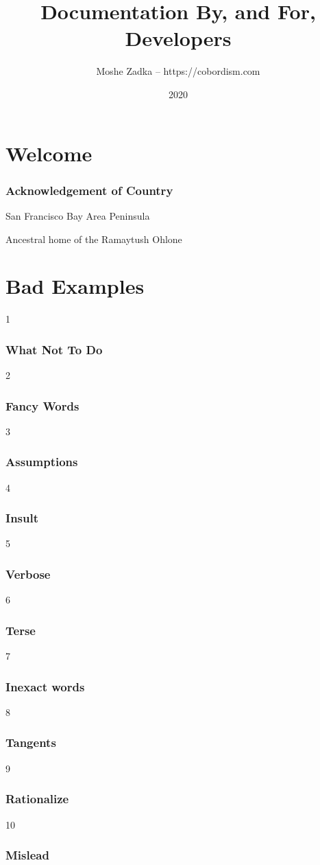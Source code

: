 \usepackage{hyperref}
\usepackage{graphicx}
\usepackage{listings}
\usepackage{textcomp}
\usepackage{fancyvrb}

\title{Documentation By, and For, Developers}
\author{Moshe Zadka -- https://cobordism.com}
\date{2020}


\begin{titlepage}
\maketitle
\end{titlepage}

\section{Welcome}

\frame{\titlepage}

\begin{frame}
\frametitle{Acknowledgement of Country}

San Francisco Bay Area Peninsula

Ancestral home of the Ramaytush Ohlone

\end{frame}

\section{Bad Examples}

1
\begin{frame}
\frametitle{What Not To Do}
\end{frame}

2
\begin{frame}
\frametitle{Fancy Words}
\end{frame}

3
\begin{frame}
\frametitle{Assumptions}
\end{frame}

4
\begin{frame}
\frametitle{Insult}
\end{frame}

5
\begin{frame}
\frametitle{Verbose}
\end{frame}

6
\begin{frame}
\frametitle{Terse}
\end{frame}

7
\begin{frame}
\frametitle{Inexact words}
\end{frame}

8
\begin{frame}
\frametitle{Tangents}
\end{frame}

9
\begin{frame}
\frametitle{Rationalize}
\end{frame}

10
\begin{frame}
\frametitle{Mislead}
\end{frame}


